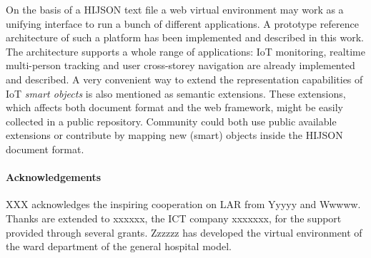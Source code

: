 \documentclass[]{egpubl}
\begin{document}
On the basis of a HIJSON text file a  web virtual
environment may work as a unifying interface to run a bunch of
different applications. A prototype reference architecture of such a platform has been
 implemented and described in this work. The architecture supports a whole
range of applications: IoT monitoring, realtime multi-person tracking and user
cross-storey navigation are already implemented and described. A very
convenient way to extend the representation capabilities of IoT \emph{smart objects} is
also mentioned as semantic extensions. These extensions, which affects both
document format and the web framework, might be easily collected in a public
repository. Community could both use public available extensions or contribute
by mapping new (smart) objects inside the HIJSON document format.


\paragraph*{Acknowledgements}


XXX acknowledges the inspiring cooperation on LAR from Yyyyy and Wwwww. Thanks are extended to xxxxxx, the ICT company xxxxxxx, for the support provided through several grants. Zzzzzz has developed the virtual environment of the ward department of the general hospital model.

\balance

%



\end{document}
